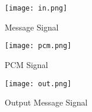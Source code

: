 \begin{figure}[H]
    \centering
    \texttt{[image: in.png]}
    \caption{Message Signal}
    \label{fig:img2}
\end{figure}

\begin{figure}[H]
    \centering
    \texttt{[image: pcm.png]}
    \caption{PCM Signal}
    \label{fig:img11}
\end{figure}

\begin{figure}[H]
    \centering
    \texttt{[image: out.png]}
    \caption{Output Message Signal}
    \label{fig:img4}
\end{figure}
